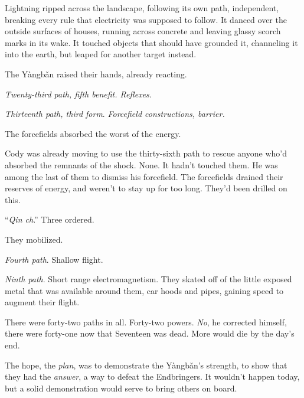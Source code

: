 





Lightning ripped across the landscape, following its own path, independent, breaking every rule that electricity was supposed to follow.  It danced over the outside surfaces of houses, running across concrete and leaving glassy scorch marks in its wake.  It touched objects that should have grounded it, channeling it into the earth, but leaped for another target instead.



The Y\`{a}ngb\v{a}n raised their hands, already reacting.



\emph{Twenty-third path, fifth benefit.  Reflexes.}



\emph{Thirteenth path, third form}.  \emph{Forcefield constructions, barrier.}



The forcefields absorbed the worst of the energy.



Cody was already moving to use the thirty-sixth path to rescue anyone who'd absorbed the remnants of the shock.  None.  It hadn't touched them.  He was among the last of them to dismiss his forcefield.  The forcefields drained their reserves of energy, and weren't to stay up for too long.  They'd been drilled on this.



``\emph{Qin ch}.''  Three ordered.



They mobilized.



\emph{Fourth path}.  Shallow flight.



\emph{Ninth path}.  Short range electromagnetism.  They skated off of the little exposed metal that was available around them, car hoods and pipes, gaining speed to augment their flight.



There were forty-two paths in all.  Forty-two powers.  \emph{No}, he corrected himself, there were forty-one now that Seventeen was dead.  More would die by the day's end.



The hope, the \emph{plan}, was to demonstrate the Y\`{a}ngb\v{a}n's strength, to show that they had the \emph{answer}, a way to defeat the Endbringers.  It wouldn't happen today, but a solid demonstration would serve to bring others on board.



